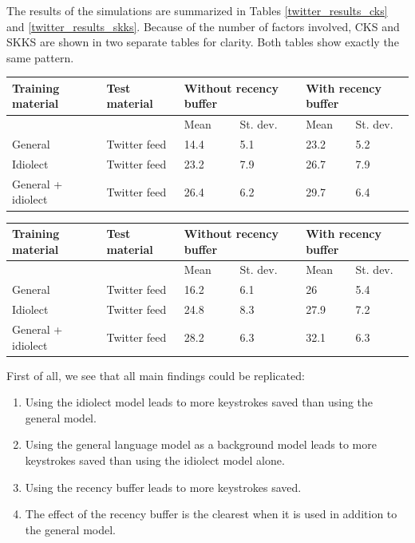 \documentclass[11pt]{article}
\let\originaltable\table
\let\endoriginaltable\endtable
\renewenvironment{table}[1][ht]{%
  \originaltable[#1]
  \centering}%
  {\endoriginaltable}
\begin{document}
The results of the simulations are summarized in Tables \ref{twitter_results_cks} and \ref{twitter_results_skks}. Because of the number of factors involved, CKS and SKKS are shown in two separate tables for clarity. Both tables show exactly the same pattern.

\begin{table}[H] 
\centering
\begin{tabular}{ll|llll} 
Training material&Test material&\multicolumn{2}{l}{Without recency buffer}&\multicolumn{2}{l}{With recency buffer}\\
\hline
&&Mean&St. dev.&Mean&St. dev.\\
General&Twitter feed&14.4&5.1&23.2&5.2\\
Idiolect&Twitter feed&23.2&7.9&26.7&7.9\\
General + idiolect&Twitter feed&26.4&6.2&29.7&6.4\\
\end{tabular} 
\caption{Mean percentage of keystrokes saved (\textbf{CKS}) and standard deviations for all module set-ups.} \label{twitter_results_cks}
\end{table}

\begin{table}[H] 
\centering
\begin{tabular}{ll|llll} 
Training material&Test material&\multicolumn{2}{l}{Without recency buffer}&\multicolumn{2}{l}{With recency buffer}\\
\hline
&&Mean&St. dev.&Mean&St. dev.\\
General&Twitter feed&16.2&6.1&26&5.4\\
Idiolect&Twitter feed&24.8&8.3&27.9&7.2\\
General + idiolect&Twitter feed&28.2&6.3&32.1&6.3\\
\end{tabular} 
\caption{Mean percentage of keystrokes saved (\textbf{SKKS}) and standard deviations for all module set-ups.} \label{twitter_results_skks}
\end{table}

First of all, we see that all main findings could be replicated: 

\begin{enumerate}
\item Using the idiolect model leads to more keystrokes saved than using the general model.
\item Using the general language model as a background model leads to more keystrokes saved than using the idiolect model alone.
\item Using the recency buffer leads to more keystrokes saved.
\item The effect of the recency buffer is the clearest when it is used in addition to the general model.
\end{enumerate}
\end{document}
